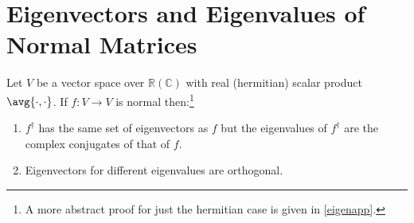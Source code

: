 \documentclass[a4paper,12pt]{report}
\begin{document}
\section{Eigenvectors and Eigenvalues of Normal Matrices}

\begin{theorem} \label{eigen} 
Let \(V\) be a vector space over \(\mathbb{R} (\mathbb{C})\) with real (hermitian) scalar product \(\avg{\cdot ,\cdot } \). If \(f: V \rightarrow V\) is normal then:\footnote{A more abstract proof for just the hermitian case is given in \cref{eigenapp}.} 

\begin{enumerate}[label=(\(P\)\arabic*)]
    \item \(f^{\dagger} \) has the same set of eigenvectors as \(f\) but the eigenvalues of \(f^{\dagger} \) are the complex conjugates of that of \(f\).
    \item Eigenvectors for different eigenvalues are orthogonal.
\end{enumerate}
   
\end{theorem}
\end{document}

